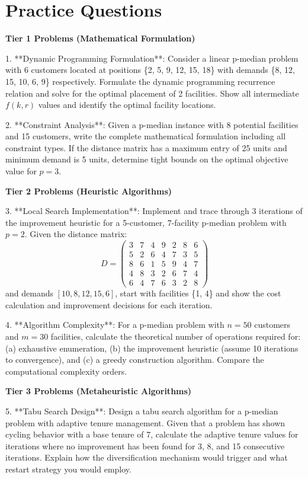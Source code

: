 \documentclass{article}
\begin{document}
\section{Practice Questions}

\textbf{Tier 1 Problems (Mathematical Formulation)}

1. **Dynamic Programming Formulation**: Consider a linear p-median problem with 6 customers located at positions \{2, 5, 9, 12, 15, 18\} with demands \{8, 12, 15, 10, 6, 9\} respectively. Formulate the dynamic programming recurrence relation and solve for the optimal placement of 2 facilities. Show all intermediate \(f(k,r)\) values and identify the optimal facility locations.

2. **Constraint Analysis**: Given a p-median instance with 8 potential facilities and 15 customers, write the complete mathematical formulation including all constraint types. If the distance matrix has a maximum entry of 25 units and minimum demand is 5 units, determine tight bounds on the optimal objective value for \(p = 3\).

\textbf{Tier 2 Problems (Heuristic Algorithms)}

3. **Local Search Implementation**: Implement and trace through 3 iterations of the improvement heuristic for a 5-customer, 7-facility p-median problem with \(p = 2\). Given the distance matrix:
\[D = \begin{pmatrix}
3 & 7 & 4 & 9 & 2 & 8 & 6 \\
5 & 2 & 6 & 4 & 7 & 3 & 5 \\
8 & 6 & 1 & 5 & 9 & 4 & 7 \\
4 & 8 & 3 & 2 & 6 & 7 & 4 \\
6 & 4 & 7 & 6 & 3 & 2 & 8
\end{pmatrix}\]
and demands \([10, 8, 12, 15, 6]\), start with facilities \{1, 4\} and show the cost calculation and improvement decisions for each iteration.

4. **Algorithm Complexity**: For a p-median problem with \(n = 50\) customers and \(m = 30\) facilities, calculate the theoretical number of operations required for: (a) exhaustive enumeration, (b) the improvement heuristic (assume 10 iterations to convergence), and (c) a greedy construction algorithm. Compare the computational complexity orders.

\textbf{Tier 3 Problems (Metaheuristic Algorithms)}

5. **Tabu Search Design**: Design a tabu search algorithm for a p-median problem with adaptive tenure management. Given that a problem has shown cycling behavior with a base tenure of 7, calculate the adaptive tenure values for iterations where no improvement has been found for 3, 8, and 15 consecutive iterations. Explain how the diversification mechanism would trigger and what restart strategy you would employ.
\end{document}
